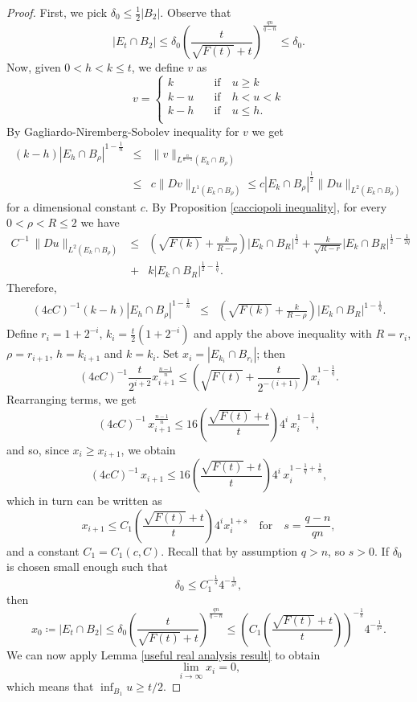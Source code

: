 \documentclass[12pt,a4paper]{amsart}
\numberwithin{equation}{section} %
\theoremstyle{definition}
\theoremstyle{remark}
\begin{document}
\begin{proof}
First, we pick $\delta_0 \leq \frac{1}{2}|B_2|$. Observe that
$$
    |E_t \cap B_2| \leq \delta_0 \left(\frac{t}{\sqrt{F(t)} + t} \right)^\frac{q n}{q-n} \leq \delta_0.
$$
Now, given $0 < h < k \leq t$, we define $v$ as 
\[   
v = 
     \begin{cases}
       k &\quad \text{if} \quad  u \geq k\\
       k-u &\quad\text{if} \quad  h < u < k \\
       k-h &\quad\text{if} \quad  u \leq h.\\
     \end{cases}
\]
By Gagliardo-Niremberg-Sobolev inequality for $v$ we get
\begin{eqnarray*}
    (k-h)|E_h \cap B_\rho|^{1 - \frac{1}{n}} & \leq & \|v\|_{L^{\frac{n}{n-1}}(E_k \cap B_\rho)}\\
    & \leq & c\|Dv\|_{L^1(E_k \cap B_\rho)}\leq c|E_k \cap B_\rho|^{\frac{1}{2}}\|Du\|_{L^2(E_k \cap B_\rho)} 
\end{eqnarray*}
for a dimensional constant $c$. By Proposition \ref{cacciopoli inequality}, for every $0 < \rho < R \leq 2$ we have
\begin{eqnarray*}
     C^{-1}\, \|Du\|_{L^2(E_k\cap B_\rho)}  &\leq&  \left(\sqrt{F(k)} +\frac{k}{R-\rho} \right)|E_k \cap B_R|^{\frac{1}{2}} + \frac{k}{\sqrt{R-r}}|E_k\cap B_R|^{\frac{1}{2}-\frac{1}{2q}}\\
     & + & k|E_k \cap B_R|^{\frac{1}{2}-\frac{1}{q}}. 
\end{eqnarray*}
Therefore,
\begin{eqnarray*}
    (4cC)^{-1}(k-h)|E_h \cap B_\rho|^{1 - \frac{1}{n}} &\leq&  \left(\sqrt{F(k)} + \frac{k}{R-\rho} \right)|E_k \cap B_R|^{1 - \frac{1}{q}}.
\end{eqnarray*}
Define $r_i = 1 + 2^{-i}$, $k_i = \frac{t}{2}(1 + 2^{-i})$ and apply the above inequality with $R = r_i$, $\rho = r_{i+1}$, $h = k_{i+1}$ and $k = k_i$. Set $x_i = |E_{k_i}\cap B_{r_i}|$; then 
$$
    (4cC)^{-1}\frac{t}{2^{i+2}}x_{i+1}^{\frac{n-1}{n}} \leq \left(\sqrt{F(t)} + \frac{t}{2^{-(i+1)}} \right)x_i^{1 - \frac{1}{q}}.
$$
Rearranging terms, we get
$$
    (4cC)^{-1}\,x_{i+1}^{\frac{n-1}{n}} \leq 16\left(\frac{\sqrt{F(t)}+t}{t}\right)4^i\,x_i^{1 - \frac{1}{q}},
$$
and so, since $x_i \geq x_{i+1}$, we obtain
$$
    (4cC)^{-1}\,x_{i+1} \leq 16\left(\frac{\sqrt{F(t)}+t}{t} \right)4^i\,x_i^{1 - \frac{1}{q} + \frac{1}{n}},
$$
which in turn can be written as
$$
    x_{i+1} \leq C_1\left(\frac{\sqrt{F(t)}+t}{t} \right)4^i x_i^{1+s} \quad \mbox{for} \quad s = \frac{q-n}{q n},
$$
and a constant $C_1 = C_1(c,C)$. Recall that by assumption $q > n$, so $s>0$. If $\delta_0$ is chosen small enough such that
$$
    \delta_0 \leq C_1^{-\frac{1}{s}}4^{-\frac{1}{s^2}},
$$
then
$$
    x_0 \coloneqq |E_t \cap B_2| \leq \delta_0 \left(\frac{t}{\sqrt{F(t)} + t} \right)^\frac{q n}{q-n}\leq \left(C_1\left(\frac{\sqrt{F(t)}+t}{t} \right)\right)^{-\frac{1}{s}}4^{-\frac{1}{s^2}}.
$$
We can now apply Lemma \ref{useful real analysis result} to obtain
$$
    \lim_{i \to \infty} x_i = 0,
$$
which means that $\inf_{B_1}u \geq t/2$.
\end{proof}
\end{document}
